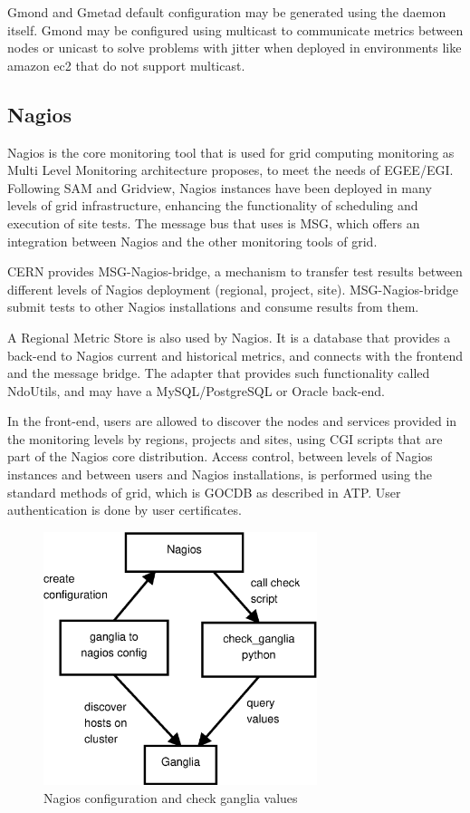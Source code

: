 Gmond and Gmetad default configuration may be generated using the daemon itself. Gmond may be configured using multicast to communicate metrics between nodes or unicast to solve problems with jitter when deployed in environments like amazon ec2 that do not support multicast.

\subsection{Nagios}

Nagios is the core monitoring tool that is used for grid computing monitoring as Multi Level Monitoring architecture proposes, to meet the needs of EGEE/EGI. Following SAM and Gridview, Nagios instances have been deployed in many levels of grid infrastructure, enhancing the functionality of scheduling and execution of site tests. The message bus that uses is MSG, which offers an integration between Nagios and the other monitoring tools of grid.

CERN provides MSG-Nagios-bridge, a mechanism to transfer test results between different levels of Nagios deployment (regional, project, site). MSG-Nagios-bridge submit tests to other Nagios installations and consume results from them. 

A Regional Metric Store is also used by Nagios. It is a database that provides a back-end to Nagios current and historical metrics, and connects with the frontend and the message bridge. The adapter that provides such functionality called NdoUtils, and may have a MySQL/PostgreSQL or Oracle back-end.

In the front-end, users are allowed to discover the nodes and services provided in the monitoring levels by regions, projects and sites, using CGI scripts that are part of the Nagios core distribution. Access control, between levels of Nagios instances and between users and Nagios installations, is performed using the standard methods of grid, which is GOCDB as described in ATP. User authentication is done by user certificates.

\begin{figure}[htb]
\centering
 \includegraphics[width=80mm]{images/nagios_check_ganglia.eps}
\caption{Nagios configuration and check ganglia values}
\label{figure:nagios_ganglia}
\end{figure}

